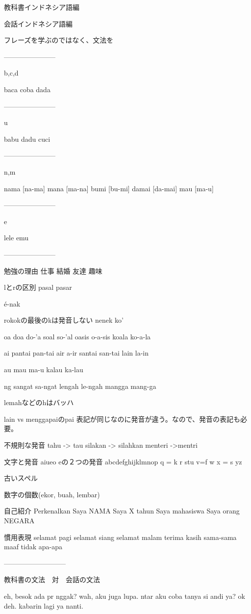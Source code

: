 \documentclass[uplatex]{jsarticle}
\begin{document}
教科書インドネシア語編

会話インドネシア語編


フレーズを学ぶのではなく、文法を


-----------------------

b,c,d

baca
coba
dada

-----------------------

u

babu
dadu
cuci

-----------------------

n,m

nama [na-ma]
mana [ma-na]
bumi [bu-mi]
damai [da-mai]
mau [ma-u]

-----------------------

e

lele
emu

-----------------------

勉強の理由
仕事
結婚
友達
趣味

lとrの区別
pasal pasar

é-nak

rokokの最後のkは発音しない
nenek
ko'

oa
doa do-'a
soal so-'al
oasis o-a-sis
koala ko-a-la

ai
pantai pan-tai
air a-ir
santai san-tai
lain la-in

au
mau ma-u
kalau ka-lau

ng
sangat sa-ngat
lengah le-ngah
mangga mang-ga

lemahなどのhはバッハ

lain vs menggapaiのpai
表記が同じなのに発音が違う。なので、発音の表記も必要。

不規則な発音
tahu -> tau
silakan -> silahkan
menteri ->mentri

文字と発音
aiueo
eの２つの発音
abcdefghijklmnop
q = k
r
stu
v=f
w
x = s
yz

古いスペル

数字の個数(ekor, buah, lembar)

自己紹介
Perkenalkan
Saya NAMA
Saya X tahun
Saya mahasiswa
Saya orang NEGARA

慣用表現
selamat pagi
selamat siang
selamat malam
terima kasih
sama-sama
maaf
tidak apa-apa

---------------------------

教科書の文法　対　会話の文法

eh, besok ada pr nggak?
wah, aku juga lupa. ntar aku coba tanya si andi ya?
ok deh. kabarin lagi ya nanti.
\end{document}
